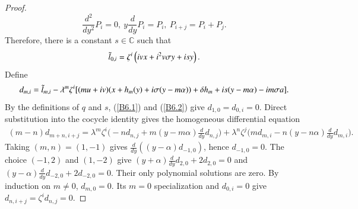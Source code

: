 \documentclass[12pt,reqno]{amsart}
\def\C{\mathbb{C}}
\numberwithin{equation}{section}
\begin{document}
\begin{proof}
   \[
       \frac{d^2}{dy^2}P_i=0,\ y\frac{d}{dy}P_i=P_i, \ P_{i+j}=P_i+P_j.
   \]
   Therefore, there is a constant $s\in\C$ such that
   \begin{equation}\label{B6.1}
\begin{aligned}
\Tilde{l}_{0,i}=\zeta^i\left(ivx+i^2v\sigma y+isy\right).
\end{aligned}
\end{equation}
Define 
\begin{equation}\label{B6.2}
\begin{aligned}
d_{m,i}=\Tilde{l}_{m,i}-\lambda^m\zeta^i[(mu+iv)(x+h_m(y)+i\sigma(y-m\alpha))+\delta h_m+is(y-m\alpha)-im\sigma a].
\end{aligned}
\end{equation}
By the definitions of $q$ and $s$, (\ref{B6.1}) and (\ref{B6.2}) give $d_{1,0}=d_{0,i}=0$. Direct substitution into the cocycle identity gives the homogeneous differential equation
\begin{equation*}\label{B6.3}
\begin{aligned}
(m-n)d_{m+n,i+j}=\lambda^m\zeta^i\Big(-nd_{n,j}+m(y-m\alpha)\frac{d}{dy}d_{n,j}\Big)+\lambda^n\zeta^j\Big(md_{m,i}-n(y-n\alpha)\frac{d}{dy}d_{m,i}\Big).
\end{aligned}
\end{equation*}
Taking $(m,n)=(1,-1)$ gives $\frac{d}{dy}((y-\alpha)d_{-1,0})$, hence $d_{-1,0}=0$. The choice $(-1,2)$ and $(1,-2)$ give $(y+\alpha)\frac{d}{dy}d_{2,0}+2d_{2,0}=0$ and $(y-\alpha)\frac{d}{dy}d_{-2,0}+2d_{-2,0}=0$. Their only polynomial solutions are zero. By induction on $m\neq0$, $d_{m,0}=0$. Its $m=0$ specialization and $d_{0,i}=0$ give $d_{n,i+j}=\zeta^id_{n,j}=0$.
\end{proof}
\end{document}
